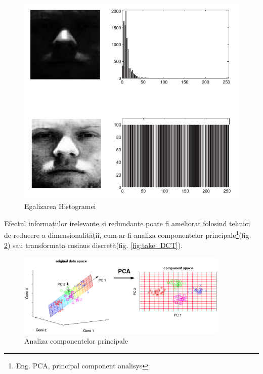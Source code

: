 \begin{figure}[H]
	\includegraphics[width=1.0\textwidth]{imagini/histogram_equalization.png}
	\caption{Egalizarea Histogramei\protect\footnotemark}
	\label{fig:egalizarea_histogrameis}
\end{figure}


Efectul informațiilor irelevante și redundante poate fi ameliorat folosind tehnici de reducere a dimensionalității, cum ar fi analiza componentelor principale\footnote{Eng. PCA, principal component analisys}(fig. \ref{fig:fig_pca_principal_component_analysis}) sau transformata cosinus discretă(fig. \ref{fig:take_DCT}).

\begin{figure}[H]
	\centering
		\includegraphics[width=0.90\textwidth]{imagini/fig_pca_principal_component_analysis.png}
	\caption{Analiza componentelor principale\protect\footnotemark}
	\label{fig:fig_pca_principal_component_analysis}
\end{figure}

